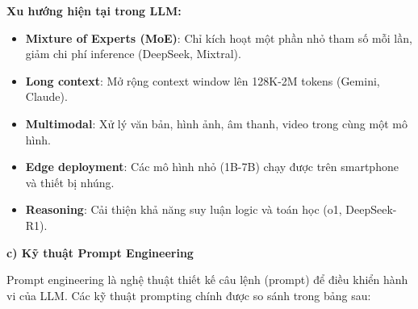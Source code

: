 \begin{table}[h!]
\centering
{}
\label{tab:llm_comparison}
\end{table}

\textbf{Xu hướng hiện tại trong LLM:}
\begin{itemize}
    \item \textbf{Mixture of Experts (MoE)}: Chỉ kích hoạt một phần nhỏ tham số mỗi lần, giảm chi phí inference (DeepSeek, Mixtral).
    \item \textbf{Long context}: Mở rộng context window lên 128K-2M tokens (Gemini, Claude).
    \item \textbf{Multimodal}: Xử lý văn bản, hình ảnh, âm thanh, video trong cùng một mô hình.
    \item \textbf{Edge deployment}: Các mô hình nhỏ (1B-7B) chạy được trên smartphone và thiết bị nhúng.
    \item \textbf{Reasoning}: Cải thiện khả năng suy luận logic và toán học (o1, DeepSeek-R1).
\end{itemize}


\textbf{c) Kỹ thuật Prompt Engineering}

Prompt engineering là nghệ thuật thiết kế câu lệnh (prompt) để điều khiển hành vi của LLM. Các kỹ thuật prompting chính được so sánh trong bảng sau:

